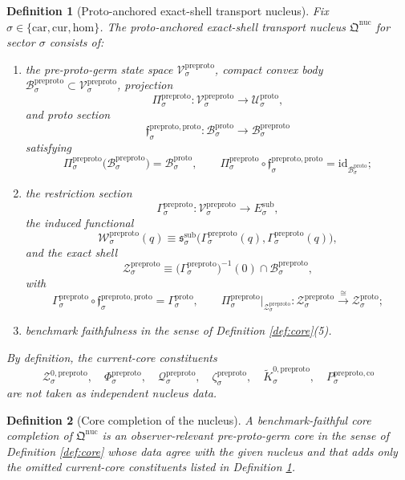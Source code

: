 \documentclass[11pt]{article}
\newcommand{\Car}{\mathrm{car}}
\newcommand{\Cur}{\mathrm{cur}}
\newcommand{\Hom}{\mathrm{hom}}
\newcommand{\SubTarget}[1]{E_{#1}^{\mathrm{sub}}}
\newcommand{\SubPair}[1]{\mathfrak s_{#1}^{\mathrm{sub}}}
\newcommand{\ProtoSpace}[1]{\mathcal U_{#1}^{\mathrm{proto}}}
\newcommand{\ProtoBody}[1]{\mathcal B_{#1}^{\mathrm{proto}}}
\newcommand{\ProtoSection}[1]{\Gamma_{#1}^{\mathrm{proto}}}
\newcommand{\ProtoShellSet}[1]{\mathcal Z_{#1}^{\mathrm{proto}}}
\newcommand{\PreProtoNucleus}{\mathfrak Q^{\mathrm{nuc}}}
\newcommand{\PreProtoSpace}[1]{\mathcal V_{#1}^{\mathrm{preproto}}}
\newcommand{\PreProtoBody}[1]{\mathcal B_{#1}^{\mathrm{preproto}}}
\newcommand{\PreProtoProj}[1]{\Pi_{#1}^{\mathrm{preproto}}}
\newcommand{\PreProtoProtoMin}[1]{\mathfrak f_{#1}^{\mathrm{preproto,proto}}}
\newcommand{\PreProtoSection}[1]{\Gamma_{#1}^{\mathrm{preproto}}}
\newcommand{\PreProtoFunctional}[1]{\mathscr W_{#1}^{\mathrm{preproto}}}
\newcommand{\PreProtoShellSet}[1]{\mathcal Z_{#1}^{\mathrm{preproto}}}
\newcommand{\PreProtoZeroCore}[1]{\mathcal Z_{#1}^{0,\mathrm{preproto}}}
\newcommand{\PreProtoSplit}[1]{\Phi_{#1}^{\mathrm{preproto}}}
\newcommand{\PreProtoCharge}[1]{\mathcal Q_{#1}^{\mathrm{preproto}}}
\newcommand{\PreProtoEmbed}[1]{\zeta_{#1}^{\mathrm{preproto}}}
\newcommand{\PreProtoKernelCh}[1]{\widetilde K_{#1}^{0,\mathrm{preproto}}}
\newcommand{\PreProtoStateComp}[1]{P_{#1}^{\mathrm{preproto,co}}}
\newtheorem{definition}{Definition}
\begin{document}
\begin{definition}[Proto-anchored exact-shell transport nucleus]
\label{def:nucleus}
Fix \(\sigma\in\{\Car,\Cur,\Hom\}\). The \emph{proto-anchored exact-shell transport nucleus} \(\PreProtoNucleus\) for sector \(\sigma\) consists of:
\begin{enumerate}
    \item the pre-proto-germ state space \(\PreProtoSpace{\sigma}\), compact convex body \(\PreProtoBody{\sigma}\subset\PreProtoSpace{\sigma}\), projection
    \[
    \PreProtoProj{\sigma}:\PreProtoSpace{\sigma}\to\ProtoSpace{\sigma},
    \]
    and proto section
    \[
    \PreProtoProtoMin{\sigma}:\ProtoBody{\sigma}\to\PreProtoBody{\sigma}
    \]
    satisfying
    \[
    \PreProtoProj{\sigma}\bigl(\PreProtoBody{\sigma}\bigr)=\ProtoBody{\sigma},
    \qquad
    \PreProtoProj{\sigma}\circ\PreProtoProtoMin{\sigma}
    =
    \mathrm{id}_{\ProtoBody{\sigma}};
    \]
    \item the restriction section
    \[
    \PreProtoSection{\sigma}:\PreProtoSpace{\sigma}\to\SubTarget{\sigma},
    \]
    the induced functional
    \[
    \PreProtoFunctional{\sigma}(q)
    \equiv
    \SubPair{\sigma}\bigl(\PreProtoSection{\sigma}(q),\PreProtoSection{\sigma}(q)\bigr),
    \]
    and the exact shell
    \[
    \PreProtoShellSet{\sigma}
    \equiv
    \bigl(\PreProtoSection{\sigma}\bigr)^{-1}(0)\cap\PreProtoBody{\sigma},
    \]
    with
    \[
    \PreProtoSection{\sigma}\circ\PreProtoProtoMin{\sigma}
    =
    \ProtoSection{\sigma},
    \qquad
    \PreProtoProj{\sigma}\big|_{\PreProtoShellSet{\sigma}}
    :
    \PreProtoShellSet{\sigma}
    \xrightarrow{\cong}
    \ProtoShellSet{\sigma};
    \]
    \item benchmark faithfulness in the sense of Definition \ref{def:core}(5).
\end{enumerate}
By definition, the current-core constituents
\[
\PreProtoZeroCore{\sigma},
\quad
\PreProtoSplit{\sigma},
\quad
\PreProtoCharge{\sigma},
\quad
\PreProtoEmbed{\sigma},
\quad
\PreProtoKernelCh{\sigma},
\quad
\PreProtoStateComp{\sigma}
\]
are \emph{not} taken as independent nucleus data.
\end{definition}

\begin{definition}[Core completion of the nucleus]
\label{def:completion}
A \emph{benchmark-faithful core completion} of \(\PreProtoNucleus\) is an observer-relevant pre-proto-germ core in the sense of Definition \ref{def:core} whose data agree with the given nucleus and that adds only the omitted current-core constituents listed in Definition \ref{def:nucleus}.
\end{definition}
\end{document}
